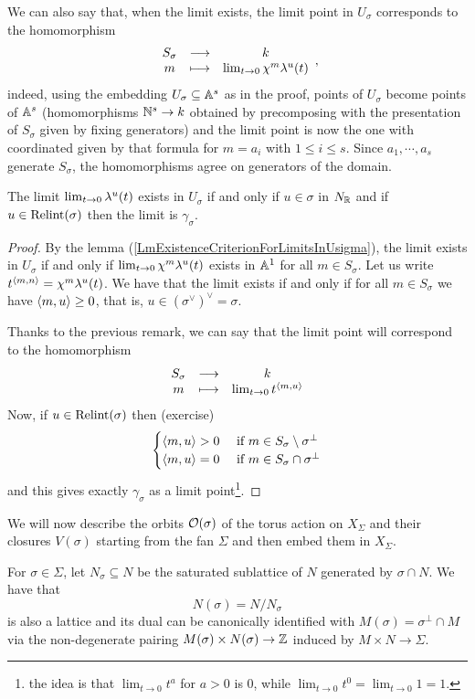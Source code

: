 \begin{remark}
We can also say that, when the limit exists, the limit point in $U_\sigma$ corresponds to the homomorphism
\[\begin{array}{ccc} {S_\sigma} & \longrightarrow & {k}\\ {m} & \longmapsto & {\lim_{t\to 0}\chi^m\lambda^u(t)} \end{array},\]
indeed, using the embedding $U_\sigma\subseteq \mathbb{A}^s$ as in the proof, points of $U_\sigma$ become points of $\mathbb{A}^s$ (homomorphisms $\mathbb{N}^s\to k$ obtained by precomposing with the presentation of $S_\sigma$ given by fixing generators) and the limit point is now the one with coordinated given by that formula for $m=a_i$ with $1\leq i\leq s$. Since $a_1,\cdots, a_s$ generate $S_\sigma$, the homomorphisms agree on generators of the domain.
\end{remark}

\begin{proposition}[]\label{PrLimitsOf1PSAreTheGammaSigma}
The limit $\lim_{t\to 0}\lambda^u(t)$ exists in $U_\sigma$ if and only if $u\in \sigma$ in $N_{\mathbb{R}}$ and if $u\in \operatorname{Relint}(\sigma)$ then the limit is $\gamma_\sigma$.
\end{proposition}
\begin{proof}
By the lemma (\ref{LmExistenceCriterionForLimitsInUsigma}), the limit exists in $U_\sigma$ if and only if $\lim_{t\to 0}\chi^m\lambda^u(t)$ exists in $\mathbb{A}^1$ for all $m\in S_\sigma$. Let us write $t^{\left\langle {m,n}\right\rangle}=\chi^m\lambda^u(t)$. We have that the limit exists if and only if for all $m\in S_\sigma$ we have $\left\langle {m,u}\right\rangle\geq 0$, that is, $u\in (\sigma^\vee)^\vee=\sigma$.


Thanks to the previous remark, we can say that the limit point will correspond to the homomorphism
\[\begin{array}{ccc} {S_\sigma} & \longrightarrow & {k}\\ {m} & \longmapsto & {\lim_{t\to 0}t^{\left\langle {m,u}\right\rangle}} \end{array}\]
Now, if $u\in \operatorname{Relint}(\sigma)$ then (exercise)
\[\begin{cases}
\left\langle {m,u}\right\rangle>0 &\text{ if }m\in S_\sigma\setminus \sigma^\perp\\
\left\langle {m,u}\right\rangle=0 &\text{ if }m\in S_\sigma\cap \sigma^\perp
\end{cases}\]
and this gives exactly $\gamma_\sigma$ as a limit point\footnote{the idea is that $\lim_{t\to 0}t^{a}$ for $a>0$ is $0$, while $\lim_{t\to 0}t^0=\lim_{t\to 0}1=1$.}.
\end{proof}




We will now describe the orbits $\mathcal{O}(\sigma)$ of the torus action on $X_\Sigma$ and their closures $V(\sigma)$ starting from the fan $\Sigma$ and then embed them in $X_\Sigma$.



For $\sigma\in \Sigma$, let $N_\sigma\subseteq N$ be the saturated sublattice of $N$ generated by $\sigma\cap N$. We have that
\[N(\sigma)=N/N_\sigma\]
is also a lattice and its dual can be canonically identified with $M(\sigma)=\sigma^\perp\cap M$ via the non-degenerate pairing $M(\sigma)\times N(\sigma)\to \mathbb{Z}$ induced by $M\times N\to \Sigma$.



